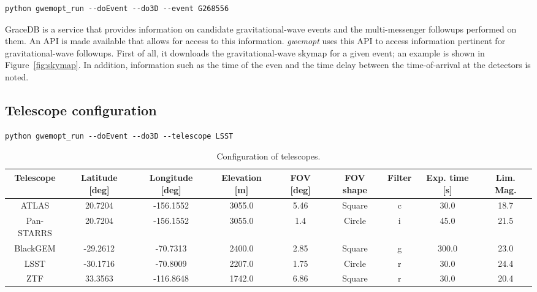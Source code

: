 \documentclass[twocolumn]{aastex62}
\begin{document}
\begin{lstlisting}
python gwemopt_run --doEvent --do3D --event G268556
\end{lstlisting}

GraceDB is a service that provides information on candidate gravitational-wave events and the multi-messenger followups performed on them. An API is made available that allows for access to this information.
\emph{gwemopt} uses this API to access information pertinent for gravitational-wave followups.
First of all, it downloads the gravitational-wave skymap for a given event; an example is shown in Figure~\ref{fig:skymap}.
In addition, information such as the time of the even and the time delay between the time-of-arrival at the detectors is noted.

\subsection{Telescope configuration}
\label{subsection:config}
\begin{lstlisting}
python gwemopt_run --doEvent --do3D --telescope LSST
\end{lstlisting}
\begin{table}[t]
\scriptsize
\centering
\begin{tabular}{|c|c|c|c|c|c|c|c|c|}
\hline
Telescope & Latitude {[}deg{]} & Longitude {[}deg{]} & Elevation {[}m{]} & FOV {[}deg{]} & FOV shape & Filter & Exp. time {[}s{]} & Lim. Mag. \\ \hline
ATLAS          & 20.7204            & -156.1552           & 3055.0            & 5.46                                      & Square              & c      & 30.0                  & 18.7               \\ \hline
Pan-STARRS     & 20.7204            & -156.1552           & 3055.0            & 1.4                                      & Circle              & i      & 45.0                  & 21.5               \\ \hline
BlackGEM       & -29.2612           & -70.7313            & 2400.0            & 2.85 & Square              & g      & 300.0                 & 23.0               \\ \hline
LSST           & -30.1716           & -70.8009            & 2207.0            & 1.75                                      & Circle              & r      & 30.0                  & 24.4               \\ \hline
ZTF            & 33.3563            & -116.8648           & 1742.0            & 6.86  & Square              & r      & 30.0                  & 20.4               \\ \hline
\end{tabular}
\caption{Configuration of telescopes.}
\label{table:config}
\end{table}
\end{document}
